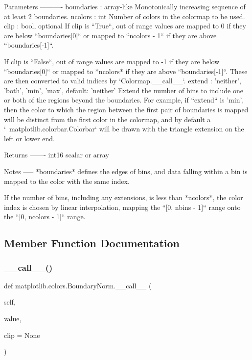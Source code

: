 \begin{DoxyVerb}Parameters
----------
boundaries : array-like
    Monotonically increasing sequence of at least 2 boundaries.
ncolors : int
    Number of colors in the colormap to be used.
clip : bool, optional
    If clip is ``True``, out of range values are mapped to 0 if they
    are below ``boundaries[0]`` or mapped to ``ncolors - 1`` if they
    are above ``boundaries[-1]``.

    If clip is ``False``, out of range values are mapped to -1 if
    they are below ``boundaries[0]`` or mapped to *ncolors* if they are
    above ``boundaries[-1]``. These are then converted to valid indices
    by `Colormap.__call__`.
extend : {'neither', 'both', 'min', 'max'}, default: 'neither'
    Extend the number of bins to include one or both of the
    regions beyond the boundaries.  For example, if ``extend``
    is 'min', then the color to which the region between the first
    pair of boundaries is mapped will be distinct from the first
    color in the colormap, and by default a
    `~matplotlib.colorbar.Colorbar` will be drawn with
    the triangle extension on the left or lower end.

Returns
-------
int16 scalar or array

Notes
-----
*boundaries* defines the edges of bins, and data falling within a bin
is mapped to the color with the same index.

If the number of bins, including any extensions, is less than
*ncolors*, the color index is chosen by linear interpolation, mapping
the ``[0, nbins - 1]`` range onto the ``[0, ncolors - 1]`` range.
\end{DoxyVerb}
 

\subsection{Member Function Documentation}
\mbox{\label{classmatplotlib_1_1colors_1_1BoundaryNorm_a23d05804e919befe676a8db4c35e840d}} 
\subsubsection{\texorpdfstring{\+\_\+\+\_\+call\+\_\+\+\_\+()}{\_\_call\_\_()}}
{\footnotesize\ttfamily def matplotlib.\+colors.\+Boundary\+Norm.\+\_\+\+\_\+call\+\_\+\+\_\+ (\begin{DoxyParamCaption}\item[{}]{self,  }\item[{}]{value,  }\item[{}]{clip = {\ttfamily None} }\end{DoxyParamCaption})}

